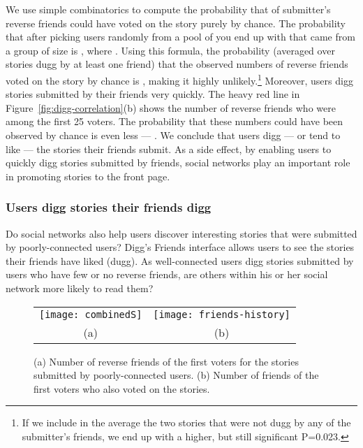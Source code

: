 \documentclass[]{article}
\newcommand{\figref}[1]{Figure~\ref{#1}}
\begin{document}
We use simple combinatorics \cite{Papoulis} to compute the probability that
 of submitter's reverse friends could have voted on the story purely by
chance. The probability that after picking  users randomly
from a pool of  you end up with  that came from a group
of size  is , where
. Using this formula, the probability (averaged over stories
dugg by at least one friend) that the observed numbers of reverse friends
voted on the story by chance is , making it highly
unlikely.\footnote{If we include in the average the two stories that
were not dugg by any of the submitter's friends, we end up with a
higher, but still significant P=0.023.} Moreover, users digg stories
submitted by their friends very quickly. The heavy red line in
\figref{fig:digg-correlation}(b) shows the number of reverse friends who
were among the first 25 voters. The probability that these numbers
could have been observed by chance is even less --- . We
conclude that users digg --- or tend to like --- the stories their friends submit.
As a side effect, by enabling users to quickly digg stories
submitted by friends, social networks play an important role in
promoting stories to the front page.


\subsubsection{Users digg stories their friends digg}  Do social networks also help
users discover interesting stories that were submitted by poorly-connected
users? Digg's Friends interface allows users to see the stories their friends have liked (dugg).
As well-connected users digg stories submitted by users who have few or no reverse friends, are others
within his or her social network more likely to read them?

\begin{figure}
\begin{tabular}{cc}
\texttt{[image: combinedS]}  &
  \texttt{[image: friends-history]}\\
  (a) & (b) \\
\end{tabular}
  \caption{(a) Number of reverse friends of the first  voters for the stories submitted by poorly-connected users.
  (b) Number of friends of the first  voters who also voted on the stories.}\label{fig:history-unknown}
\end{figure}
\end{document}
